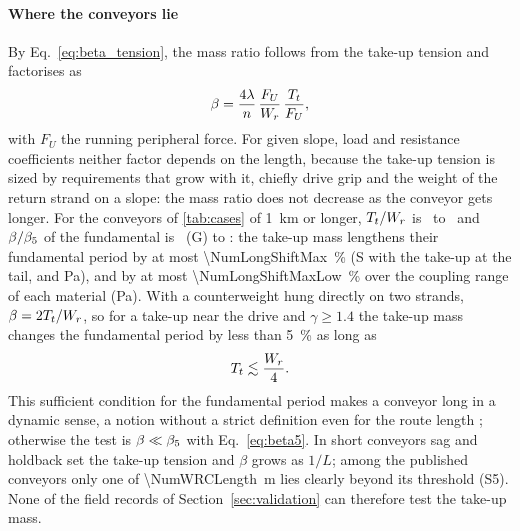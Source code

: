 \paragraph{Where the conveyors lie} By Eq.~\eqref{eq:beta_tension}, the mass ratio follows from
the take-up tension and factorises as
\begin{equation}\label{eq:beta_factors}
  \beta=\frac{4\lambda}{n}\,\frac{F_U}{W_r}\,\frac{T_t}{F_U},
\end{equation}
with $F_U$ the running peripheral force. For given slope, load and resistance coefficients
neither factor depends on the length, because the take-up tension is sized by requirements that
grow with it, chiefly drive grip \citep[Eqs.~47--50]{din22101} and the weight of the return
strand on a slope: the mass ratio does not decrease as the conveyor gets longer. For the
conveyors of \cref{tab:cases} of \qty{1}{\kilo\metre} or longer, $T_t/W_r$ is
\NumLongTtWrMin\ to \NumLongTtWrMax\ and $\beta/\beta_5$ of the fundamental is
\NumLongBetaRatioMin\ (G) to \NumLongBetaRatioMax: the take-up mass lengthens their fundamental
period by at most \qty{\NumLongShiftMax}{\percent} (S with the take-up at the tail, and Pa), and
by at most \qty{\NumLongShiftMaxLow}{\percent} over the coupling range of each material (Pa). With
a counterweight hung directly on two strands, $\beta=2T_t/W_r$, so for a take-up near the drive
and $\gamma\ge1.4$ the take-up mass changes the fundamental period by less than
\qty{5}{\percent} as long as
\begin{equation}\label{eq:rule}
  T_t\lesssim\frac{W_r}{4}.
\end{equation}
This sufficient condition for the fundamental period makes a conveyor long in a dynamic sense,
a notion without a strict definition even for the route length \citep{suchorab2025longdistance};
otherwise the test is $\beta\ll\beta_5$ with Eq.~\eqref{eq:beta5}. In short conveyors sag and holdback set the take-up tension and $\beta$
grows as $1/L$; among the published conveyors only one of \qty{\NumWRCLength}{\metre} lies
clearly beyond its threshold (S5). None of the field records of Section~\ref{sec:validation}
can therefore test the take-up mass.

